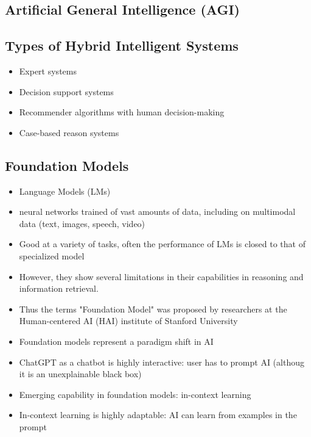 \subsection{Artificial General Intelligence (AGI)}



\subsection{Types of Hybrid Intelligent Systems}

\begin{itemize}
    \item Expert systems 
    \item Decision support systems
    \item Recommender algorithms with human decision-making
    \item Case-based reason systems
\end{itemize}


\subsection{Foundation Models}

\begin{itemize}
    \item Language Models (LMs)
    \item neural networks trained of vast amounts of data, including on multimodal data (text, images, speech, video)
    \item Good at a variety of tasks, often the performance of LMs is closed to that of specialized model
    \item However, they show several limitations in their capabilities in reasoning and information retrieval. 
    \item Thus the terms "Foundation Model" was proposed by researchers at the Human-centered AI (HAI) institute of Stanford University
\end{itemize}

\begin{itemize}
    \item Foundation models represent a paradigm shift in AI
    \item ChatGPT as a chatbot is highly interactive: user has to prompt AI (althoug it is an unexplainable black box)
    \item Emerging capability in foundation models: in-context learning 
    \item In-context learning is highly adaptable: AI can learn from examples in the prompt 
\end{itemize}

